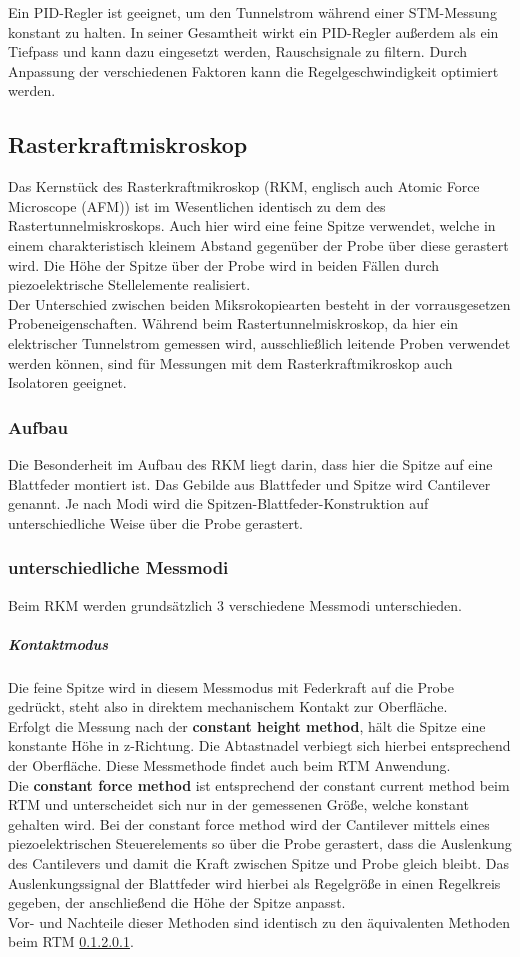 \documentclass[a4paper,twoside,final]{article}
\begin{document}
Ein PID-Regler ist geeignet, um den Tunnelstrom während einer STM-Messung konstant zu halten. In seiner Gesamtheit wirkt ein PID-Regler außerdem als ein Tiefpass und kann dazu eingesetzt werden, Rauschsignale zu filtern. Durch Anpassung der verschiedenen Faktoren kann die Regelgeschwindigkeit optimiert werden.

\subsection{Rasterkraftmiskroskop}
Das Kernstück des Rasterkraftmikroskop (RKM, englisch auch Atomic Force Microscope (AFM)) ist im Wesentlichen identisch zu dem des Rastertunnelmiskroskops. Auch hier wird eine feine Spitze verwendet, welche in einem charakteristisch kleinem Abstand gegenüber der Probe über diese gerastert wird. Die Höhe der Spitze über der Probe wird in beiden Fällen durch piezoelektrische Stellelemente realisiert. \\
Der Unterschied zwischen beiden Miksrokopiearten besteht in der vorrausgesetzen Probeneigenschaften. Während beim Rastertunnelmiskroskop, da hier ein elektrischer Tunnelstrom gemessen wird, ausschließlich leitende Proben verwendet werden können, sind für Messungen mit dem Rasterkraftmikroskop auch Isolatoren geeignet.

\subsubsection{Aufbau}
Die Besonderheit im Aufbau des RKM liegt darin, dass hier die Spitze auf eine Blattfeder montiert ist. Das Gebilde aus Blattfeder und Spitze wird Cantilever genannt. Je nach Modi wird die Spitzen-Blattfeder-Konstruktion auf unterschiedliche Weise über die Probe gerastert.

\subsubsection{unterschiedliche Messmodi}
Beim RKM werden grundsätzlich 3 verschiedene Messmodi unterschieden.
\subparagraph{Kontaktmodus}
Die feine Spitze wird in diesem Messmodus mit Federkraft auf die Probe gedrückt, steht also in direktem mechanischem Kontakt zur Oberfläche. \\
Erfolgt die Messung nach der \textbf{constant height method}, hält die Spitze eine konstante Höhe in z-Richtung. Die Abtastnadel verbiegt sich hierbei entsprechend der Oberfläche. Diese Messmethode findet auch beim RTM Anwendung. \\
Die \textbf{constant force method} ist entsprechend der constant current method beim RTM und unterscheidet sich nur in der gemessenen Größe, welche konstant gehalten wird. Bei der constant force method wird der Cantilever mittels eines piezoelektrischen Steuerelements so über die Probe gerastert, dass die Auslenkung des Cantilevers und damit die Kraft zwischen Spitze und Probe gleich bleibt. Das Auslenkungssignal der Blattfeder wird hierbei als Regelgröße in einen Regelkreis gegeben, der anschließend die Höhe der Spitze anpasst.\\
Vor- und Nachteile dieser Methoden sind identisch zu den äquivalenten Methoden beim RTM \ref{}.
\end{document}
